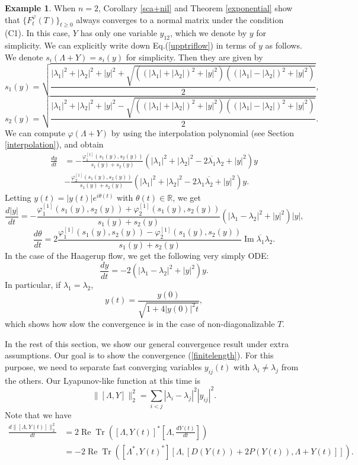 \documentclass[12pt]{article}
\theoremstyle{definition}
\newtheorem{example}[theorem]{Example}
\numberwithin{equation}{section}
\newcommand{\R}{\mathbb{R}}
\DeclareMathOperator{\Tr}{Tr}
\renewcommand{\Re}{\operatorname{Re}}
\renewcommand{\Im}{\operatorname{Im}}
\begin{document}
\begin{example} When $n=2$, Corollary \ref{sca+nil} and Theorem \ref{exponential} show that $\{F^\varphi_t(T)\}_{t\geq 0}$ 
always converges to a normal matrix under the condition (C1). 
In this case, $Y$ has only one variable $y_{12}$, which we denote by $y$ for simplicity. 
We can explicitly write down Eq.(\ref{upptriflow}) in terms of $y$ as follows. 
We denote $s_i(\Lambda+Y)=s_i(y)$ for simplicity. 
Then they are given by  
\[s_1(y)=\sqrt{\frac{|\lambda_1|^2+|\lambda_2|^2+|y|^2+\sqrt{\left((|\lambda_1|+|\lambda_2|)^2+|y|^2\right)
\left((|\lambda_1|-|\lambda_2|)^2+|y|^2\right)}}{2}},\]
\[s_2(y)=\sqrt{\frac{|\lambda_1|^2+|\lambda_2|^2+|y|^2-\sqrt{\left((|\lambda_1|+|\lambda_2|)^2+|y|^2\right)
\left((|\lambda_1|-|\lambda_2|)^2+|y|^2\right)}}{2}}.\]
We can compute $\varphi(\Lambda+Y)$ by using the interpolation polynomial (see Section \ref{interpolation}), and obtain 
\begin{align*}
\frac{dy}{dt}	 & =-\frac{\varphi_1^{[1]}(s_1(y),s_2(y))}{s_1(y)+s_2(y)}(|\lambda_1|^2+|\lambda_2|^2-2\overline{\lambda_1}\lambda_2+|y|^2)y\\
	& -\frac{\varphi_2^{[1]}(s_1(y),s_2(y))}{s_1(y)+s_2(y)}(|\lambda_1|^2+|\lambda_2|^2-2\lambda_1\overline{\lambda_2}+|y|^2)y.
\end{align*}
Letting $y(t)=|y(t)|e^{i\theta(t)}$ with $\theta(t)\in \R$, we get 
\[\frac{d|y|}{dt}=-\frac{\varphi_1^{[1]}(s_1(y),s_2(y))+\varphi_2^{[1]}(s_1(y),s_2(y))}{s_1(y)+s_2(y)}(|\lambda_1-\lambda_2|^2+|y|^2)|y|, \]
\[\frac{d\theta}{dt}=2\frac{\varphi_1^{[1]}(s_1(y),s_2(y))-\varphi_2^{[1]}(s_1(y),s_2(y))}{s_1(y)+s_2(y)}\Im \overline{\lambda_1}\lambda_2.
\]
In the case of the Haagerup flow, we get the following very simply ODE: 
\[\frac{dy}{dt}=-2(|\lambda_1-\lambda_2|^2+|y|^2)y.\]
In particular, if $\lambda_1=\lambda_2$, 
\[y(t)=\frac{y(0)}{\sqrt{1+4|y(0)|^2t}},\]
which shows how slow the convergence is in the case of non-diagonalizable $T$. 
\end{example}

In the rest of this section, we show our general convergence result under extra assumptions.
Our goal is to show the convergence (\ref{finitelength}). 
For this purpose, we need to separate fast converging variables $y_{ij}(t)$ with $\lambda_i\neq \lambda_j$ 
from the others. 
Our Lyapunov-like function at this time is 
\[\|[\Lambda, Y]\|_2^2=\sum_{i<j}|\lambda_i-\lambda_j|^2|y_{ij}|^2.\] 
Note that we have 
\begin{align}\label{Lfderivative}
\frac{d\|[\Lambda,Y(t)]\|_2^2}{dt}	 &=2\Re\Tr([\Lambda,Y(t)]^*[\Lambda,\frac{dY(t)}{dt}])  \\
&= -2\Re\Tr([\Lambda^*,Y(t)^*][\Lambda,[D(Y(t))+2P(Y(t)), \Lambda+Y(t)]]). \nonumber
\end{align}
\end{document}
